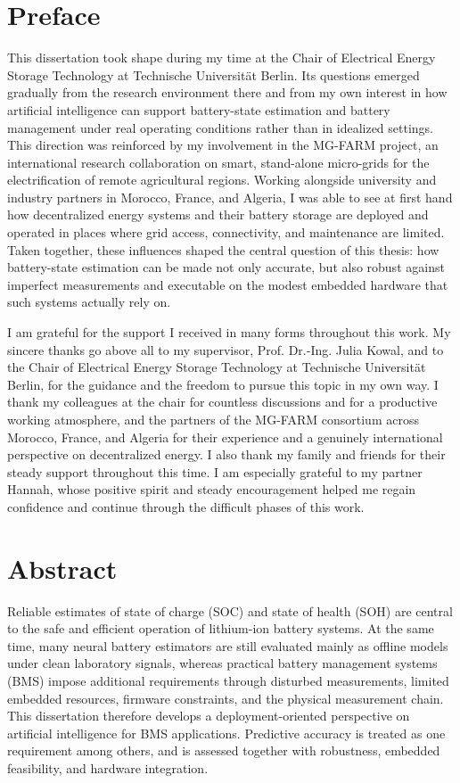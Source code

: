 \documentclass[
    a4paper,
    12pt,
    titlepage,
    bibliography=totoc,
    twoside=on,
    parskip=false,
    numbers=noenddot,
    cleardoublepage=empty,
    DIV=12,
    BCOR=12.0mm,
    headheight=36pt,
    headings=openright
]{scrreprt}
\begin{document}
\cleardoublepage
\chapter*{Preface}
This dissertation took shape during my time at the Chair of Electrical Energy Storage Technology at Technische Universit\"at Berlin. Its questions emerged gradually from the research environment there and from my own interest in how artificial intelligence can support battery-state estimation and battery management under real operating conditions rather than in idealized settings. This direction was reinforced by my involvement in the MG-FARM project, an international research collaboration on smart, stand-alone micro-grids for the electrification of remote agricultural regions. Working alongside university and industry partners in Morocco, France, and Algeria, I was able to see at first hand how decentralized energy systems and their battery storage are deployed and operated in places where grid access, connectivity, and maintenance are limited. Taken together, these influences shaped the central question of this thesis: how battery-state estimation can be made not only accurate, but also robust against imperfect measurements and executable on the modest embedded hardware that such systems actually rely on.

I am grateful for the support I received in many forms throughout this work. My sincere thanks go above all to my supervisor, Prof. Dr.-Ing. Julia Kowal, and to the Chair of Electrical Energy Storage Technology at Technische Universit\"at Berlin, for the guidance and the freedom to pursue this topic in my own way. I thank my colleagues at the chair for countless discussions and for a productive working atmosphere, and the partners of the MG-FARM consortium across Morocco, France, and Algeria for their experience and a genuinely international perspective on decentralized energy. I also thank my family and friends for their steady support throughout this time. I am especially grateful to my partner Hannah, whose positive spirit and steady encouragement helped me regain confidence and continue through the difficult phases of this work.

\chapter*{Abstract}
Reliable estimates of state of charge (SOC) and state of health (SOH) are central to the safe and efficient operation of lithium-ion battery systems. At the same time, many neural battery estimators are still evaluated mainly as offline models under clean laboratory signals, whereas practical battery management systems (BMS) impose additional requirements through disturbed measurements, limited embedded resources, firmware constraints, and the physical measurement chain. This dissertation therefore develops a deployment-oriented perspective on artificial intelligence for BMS applications. Predictive accuracy is treated as one requirement among others, and is assessed together with robustness, embedded feasibility, and hardware integration.
\end{document}
